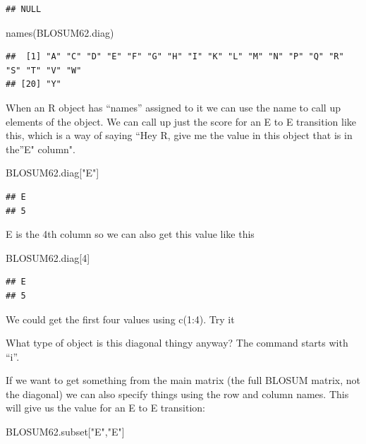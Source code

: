 \documentclass[
]{book}
\newenvironment{Shaded}{\begin{snugshade}}{\end{snugshade}}
\newcommand{\DecValTok}[1]{\textcolor[rgb]{0.00,0.00,0.81}{#1}}
\newcommand{\FunctionTok}[1]{\textcolor[rgb]{0.00,0.00,0.00}{#1}}
\newcommand{\NormalTok}[1]{#1}
\newcommand{\StringTok}[1]{\textcolor[rgb]{0.31,0.60,0.02}{#1}}
\begin{document}
\begin{verbatim}
## NULL
\end{verbatim}

\begin{Shaded}
\begin{Highlighting}[]
\FunctionTok{names}\NormalTok{(BLOSUM62.diag)}
\end{Highlighting}
\end{Shaded}

\begin{verbatim}
##  [1] "A" "C" "D" "E" "F" "G" "H" "I" "K" "L" "M" "N" "P" "Q" "R" "S" "T" "V" "W"
## [20] "Y"
\end{verbatim}

When an R object has ``names'' assigned to it we can use the name to call up elements of the object.
We can call up just the score for an E to E transition like this, which is a way of saying ``Hey R, give me the value in this object that is in the''E" column".

\begin{Shaded}
\begin{Highlighting}[]
\NormalTok{BLOSUM62.diag[}\StringTok{"E"}\NormalTok{]}
\end{Highlighting}
\end{Shaded}

\begin{verbatim}
## E 
## 5
\end{verbatim}

E is the 4th column so we can also get this value like this

\begin{Shaded}
\begin{Highlighting}[]
\NormalTok{BLOSUM62.diag[}\DecValTok{4}\NormalTok{]}
\end{Highlighting}
\end{Shaded}

\begin{verbatim}
## E 
## 5
\end{verbatim}

We could get the first four values using c(1:4). Try it

What type of object is this diagonal thingy anyway? The command starts with ``i''.

If we want to get something from the main matrix (the full BLOSUM matrix, not the diagonal) we can also specify things using the row and column names. This will give us the value for an E to E transition:

\begin{Shaded}
\begin{Highlighting}[]
\NormalTok{BLOSUM62.subset[}\StringTok{"E"}\NormalTok{,}\StringTok{"E"}\NormalTok{]}
\end{Highlighting}
\end{Shaded}
\end{document}
